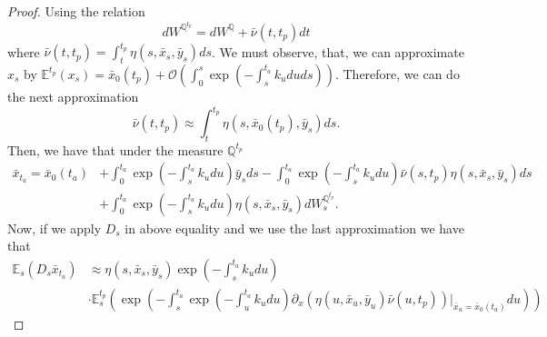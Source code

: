 \documentclass[a4paper,10pt]{article}
\newcommand{\1}{\mathbf{1}}
\begin{document}
\begin{proof}
Using the relation 
\begin{equation*}
dW^{\mathbb{Q}^{t_p}} = dW^{\mathbb{Q}} + \bar{\nu}(t,t_p) dt
\end{equation*}
where $\bar{\nu}(t,t_p) = \int_{t}^{t_p} \eta(s,\bar{x}_s,\bar{y}_s) ds$. We must observe, that, we can approximate $x_s$ by $\mathbb{E}^{t_p}(x_s) = \bar{x}_0(t_p) + \mathcal{O}(\int_{0}^{s}\exp\left(-\int_{s}^{t_a}k_u du ds\right))$. Therefore, we can do the next approximation
\begin{equation*}
\bar{\nu}(t,t_p)\approx \int_{t}^{t_p} \eta(s,\bar{x}_0(t_p),\bar{y}_s) ds.
\end{equation*}
Then, we have that under the measure $\mathbb{Q}^{t_p}$ 
\begin{align*}
\bar{x}_{t_a} = \bar{x}_0(t_a) &+ \int_{0}^{t_a} \exp\left(-\int_{s}^{t_a}k_u du\right) \bar{y}_s ds - \int_{0}^{t_a} \exp\left(-\int_{s}^{t_a}k_u du\right) \bar{\nu}(s, t_p) \eta(s,\bar{x}_s,\bar{y}_s) ds   \\
&+ \int_{0}^{t_a}  \exp\left(-\int_{s}^{t_a}k_u du \right)\eta(s,\bar{x}_s,\bar{y}_s) dW_s^{\mathbb{Q}^{t_p}}. 
\end{align*}
Now, if we apply $D_s$ in above equality and we use the last approximation we have that
\begin{align*}
\mathbb{E}_s(D_s \bar{x}_{t_a}) &\approx \eta(s,\bar{x}_s,\bar{y}_s) \exp\left(-\int_{s}^{t_a}k_u du \right)\\ &\cdot \mathbb{E}^{t_p}_s\left(\exp\left(-\int_{s}^{t_a} \exp\left(-\int_{u}^{t_a}k_u du\right)\partial_x (\eta(u, \bar{x}_u, \bar{y}_{u}) \bar{\nu}(u,t_p))|_{\bar{x}_u=\bar{x}_0(t_a)} du \right)\right) 
\end{align*}
\end{proof}
\end{document}

